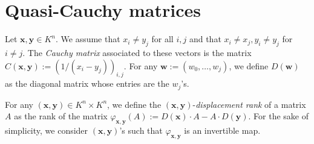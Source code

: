 \documentclass[11pt]{exam}
\theoremstyle{definition}
\newcommand{\vc}[1]{\mathbf{#1}}
\begin{document}
  \section{Quasi-Cauchy matrices}

  Let $\vc x,\vc y \in K^n $. We assume that $x_i\neq y_j$ for all $i,j$ and that $x_i\neq x_j, y_i\neq y_j$ for $i\neq j$. The {\em Cauchy matrix} associated to these vectors is the matrix $C(\vc x,\vc y):= (1/(x_i-y_j))_{i,j}$. For any $\vc w:=(w_0,\dotsc,w_j)$, we define $D(\vc w)$ as the diagonal matrix whose entries are the $w_j$'s.

  For any $(\vc x,\vc y) \in K^n\times K^n$, we define the $(\vc x, \vc y)$-{\em displacement rank} of a matrix $A$ as the rank of the matrix $\varphi_{\vc x, \vc y}(A):= D(\vc x)\cdot A - A\cdot D(\vc y)$.   For the sake of simplicity, we consider $(\vc x,\vc y)$'s such that $\varphi_{\vc x,\vc y}$ is an invertible map.
\end{document}
